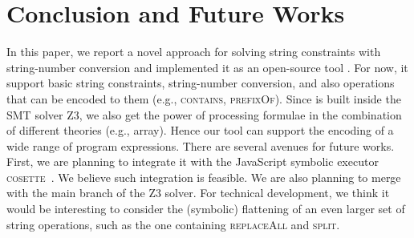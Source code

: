 \documentclass[sigplan,review,anonymous]{acmart}\settopmatter{printfolios=true,printccs=false,printacmref=false}
\begin{document}
\section{Conclusion and Future Works}
\label{section:conclusion}
In this paper, we report a novel approach for solving string constraints with string-number conversion and implemented it as an open-source tool {\tool}. For now, it support basic string constraints, string-number conversion, and also operations that can be encoded to them (e.g., \textsc{contains}, \textsc{prefixOf}). Since {\tool} is built inside the SMT solver Z3, we also get the power of processing formulae in the combination of different theories (e.g., array). Hence our tool can support the encoding of a wide range of program expressions. There are several avenues for future works. First, we are planning to integrate it with the JavaScript symbolic executor \textsc{cosette}~\cite{santos2018symbolic}. We  believe such integration  is feasible. 
We are also planning to merge  {\tool}  with the main branch of the Z3 solver. For technical development, we think it would be interesting to consider the (symbolic) flattening of an even larger set of string operations, such as the one containing  \textsc{replaceAll} and \textsc{split}. 



\end{document}
